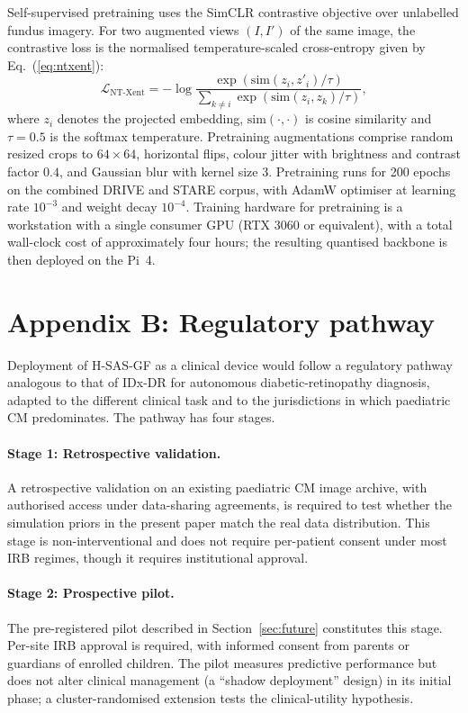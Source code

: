 \documentclass[twocolumn,10pt]{article}
\begin{document}
Self-supervised pretraining uses the SimCLR contrastive objective
\cite{Chen2020SimCLR} over unlabelled fundus imagery. For two
augmented views $(I, I')$ of the same image, the contrastive loss
is the normalised temperature-scaled cross-entropy given by
Eq.~(\ref{eq:ntxent}):
\begin{equation}
\mathcal{L}_{\mathrm{NT\text{-}Xent}} =
-\log\frac{\exp(\mathrm{sim}(z_i, z'_i)/\tau)}
{\sum_{k\neq i}\exp(\mathrm{sim}(z_i, z_k)/\tau)},
\label{eq:ntxent}
\end{equation}
where $z_i$ denotes the projected embedding,
$\mathrm{sim}(\cdot,\cdot)$ is cosine similarity and
$\tau = 0.5$ is the softmax temperature. Pretraining augmentations
comprise random resized crops to $64\times 64$, horizontal flips,
colour jitter with brightness and contrast factor $0.4$, and
Gaussian blur with kernel size $3$. Pretraining runs for 200
epochs on the combined DRIVE and STARE corpus, with AdamW optimiser
\cite{Loshchilov2019AdamW} at learning rate $10^{-3}$ and weight
decay $10^{-4}$. Training hardware for pretraining is a workstation
with a single consumer GPU (RTX 3060 or equivalent), with a total
wall-clock cost of approximately four hours; the resulting
quantised backbone is then deployed on the Pi~4.

\section*{Appendix B: Regulatory pathway}
\label{app:regulatory}
Deployment of H-SAS-GF as a clinical device would follow a
regulatory pathway analogous to that of IDx-DR
\cite{Abramoff2018IDx} for autonomous diabetic-retinopathy
diagnosis, adapted to the different clinical task and to the
jurisdictions in which paediatric CM predominates. The pathway
has four stages.

\paragraph{Stage 1: Retrospective validation.}
A retrospective validation on an existing paediatric CM image
archive, with authorised access under data-sharing agreements,
is required to test whether the simulation priors in the present
paper match the real data distribution. This stage is
non-interventional and does not require per-patient consent
under most IRB regimes, though it requires institutional
approval.

\paragraph{Stage 2: Prospective pilot.}
The pre-registered pilot described in
Section~\ref{sec:future} constitutes this stage. Per-site IRB
approval is required, with informed consent from parents or
guardians of enrolled children. The pilot measures predictive
performance but does not alter clinical management (a
``shadow deployment'' design) in its initial phase; a
cluster-randomised extension tests the clinical-utility
hypothesis.
\end{document}
